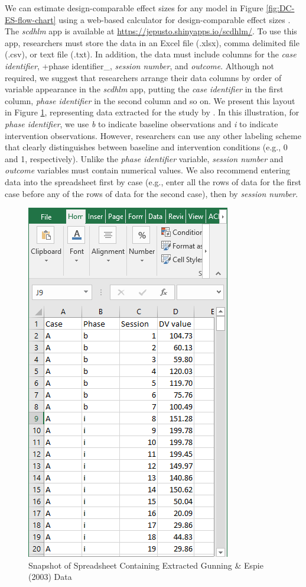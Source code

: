 \documentclass[
]{book}
\begin{document}
We can estimate design-comparable effect sizes for any model in Figure \ref{fig:DC-ES-flow-chart} using a web-based calculator for design-comparable effect sizes \citep{pustejovsky2021scdhlm}. The \emph{scdhlm} app is available at \url{https://jepusto.shinyapps.io/scdhlm/}. To use this app, researchers must store the data in an Excel file (.xlsx), comma delimited file (.csv), or text file (.txt). In addition, the data must include columns for the \emph{case identifier}, +phase identifier\_, \emph{session number}, and \emph{outcome}.
Although not required, we suggest that researchers arrange their data columns by order of variable appearance in the \emph{scdhlm} app, putting the \emph{case identifier} in the first column, \emph{phase identifier} in the second column and so on. We present this layout in Figure \ref{fig:Gunning-2003-excel}, representing data extracted for the study by \citet{gunning2003Psychological}.
In this illustration, for \emph{phase identifier}, we use \emph{b} to indicate baseline observations and \emph{i} to indicate intervention observations. However, researchers can use any other labeling scheme that clearly distinguishes between baseline and intervention conditions (e.g., 0 and 1, respectively). Unlike the \emph{phase identifier} variable, \emph{session number} and \emph{outcome} variables must contain numerical values. We also recommend entering data into the spreadsheet first by case (e.g., enter all the rows of data for the first case before any of the rows of data for the second case), then by \emph{session number}.

\begin{figure}
\includegraphics[width=0.6\linewidth]{images/excel_GunningEspie2003} \caption{Snapshot of Spreadsheet Containing Extracted Gunning \& Espie (2003) Data}\label{fig:Gunning-2003-excel}
\end{figure}
\end{document}
